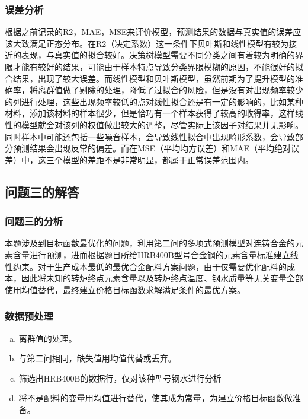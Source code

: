 \documentclass{xcumcmart}
\begin{document}
\subsubsection{误差分析}
\par 根据之前记录的R2，MAE，MSE来评价模型，预测结果的数据与真实值的误差应该大致满足正态分布。在R2（决定系数）这一条件下贝叶斯和线性模型有较为接近的表现，与真实值的拟合较好。决策树模型需要不同分类之间有着较为明确的界限才能有较好的结果，可能由于样本特点导致分类界限模糊的原因，不能很好的拟合结果，出现了较大误差。而线性模型和贝叶斯模型，虽然前期为了提升模型的准确率，将离群值做了剔除的处理，降低了过拟合的风险，但是没有对出现频率较少的列进行处理，这些出现频率较低的点对线性拟合还是有一定的影响的，比如某种材料，添加该材料的样本很少，但是恰巧有一个样本获得了较高的收得率，这样线性的模型就会对该列的权值做出较大的调整，尽管实际上该因子对结果并无影响。同时样本中可能还包括一些噪音样本，会导致线性拟合中出现畸形系数，会导致部分预测结果会出现反常的偏差。而在MSE（平均均方误差）和MAE（平均绝对误差）中，这三个模型的差距不是非常明显，都属于正常误差范围内。

\subsection{问题三的解答}
\subsubsection{问题三的分析}
\par 本题涉及到目标函数最优化的问题，利用第二问的多项式预测模型对连铸合金的元素含量进行预测，进而根据题目所给HRB400B型号合金钢的元素含量标准建立线性约束。对于生产成本最低的最优合金配料方案问题，由于仅需要优化配料的成本，因此将未知的转炉终点元素含量以及转炉终点温度、钢水质量等无关变量全部使用均值替代，最终建立价格目标函数求解满足条件的最优方案。

\subsubsection{数据预处理}
\begin{enumerate}[(a)]
\setlength{\itemindent}{2em}    %
\item 离群值的处理。
\item 与第二问相同，缺失值用均值代替或丢弃。
\item 筛选出HRB400B的数据行，仅对该种型号钢水进行分析
\item 将不是配料的变量用均值进行替代，使其成为常量，为建立价格目标函数做准备。
\end{enumerate}
\end{document}
